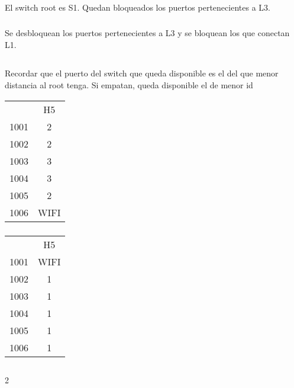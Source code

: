 \setcounter{subsection}{3}
\subsection{}
\subsubsection{}
El switch root es S1. Quedan bloqueados los puertos pertenecientes a L3.

\subsubsection{}
Se desbloquean los puertos pertenecientes a L3 y se bloquean los que conectan L1.

\setcounter{subsection}{5}
\subsection{}
\subsubsection{}
Recordar que el puerto del switch que queda disponible es el del que menor distancia al root tenga. Si empatan, queda disponible el de menor id
\begin{tabular}{c|c}
& H5 \\
1001 & 2 \\
1002 & 2 \\
1003 & 3 \\
1004 & 3 \\
1005 & 2 \\
1006 & WIFI \\
\end{tabular}

\subsubsection{}
\begin{tabular}{c|c}
& H5 \\
1001 & WIFI \\
1002 & 1 \\
1003 & 1 \\
1004 & 1 \\
1005 & 1 \\
1006 & 1 \\
\end{tabular}

\setcounter{subsection}{7}
\subsection{}

\setcounter{subsubsection}{1}
\subsubsection{}
2